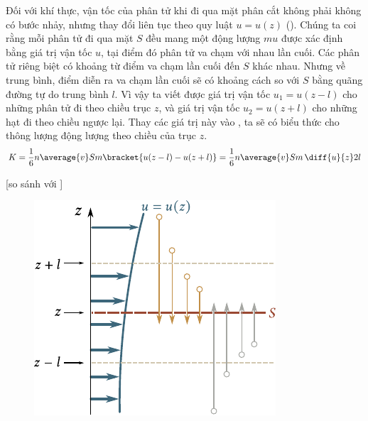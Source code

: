 Đối với khí thực, vận tốc của phân tử khi đi qua mặt phân cắt không phải không có bước nhảy, nhưng thay đổi liên tục theo quy luật $u=u(z)$ (). Chúng ta coi rằng mỗi phân tử đi qua mặt $S$ đều mang một động lượng $mu$ được xác định bằng giá trị vận tốc $u$, tại điểm đó phân tử va chạm với nhau lần cuối. Các phân tử riêng biệt có khoảng từ điểm va chạm lần cuối đến $S$ khác nhau. Nhưng về trung bình, điểm diễn ra va chạm lần cuối sẽ có khoảng cách so với $S$ bằng quãng đường tự do trung bình $l$. Vì vậy ta viết được giá trị vận tốc $u_1=u(z-l)$ cho những phân tử đi theo chiều trục $z$, và giá trị vận tốc $u_2=u(z+l)$ cho những hạt đi theo chiều ngược lại. Thay các giá trị này vào , ta sẽ có biểu thức cho thông lượng động lượng theo chiều của trục $z$.
\begin{equation*}
    K = \frac{1}{6} n \average{v} S m \bracket{u(z-l)-u(z+l)} = \frac{1}{6} n \average{v} S m\,\diff{u}{z} 2l
\end{equation*}

\noindent
[so sánh với ]

\begin{figure}[!htb]
	\begin{center}
		\includegraphics[scale=1]{figures/ch_16/fig_16_9.pdf}
		\caption[]{}
		\label{fig:16_9}
	\end{center}
\end{figure}

